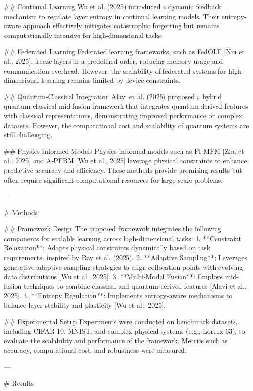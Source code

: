 ## Continual Learning  
Wu et al. (2025) introduced a dynamic feedback mechanism to regulate layer entropy in continual learning models. Their entropy-aware approach effectively mitigates catastrophic forgetting but remains computationally intensive for high-dimensional tasks.

## Federated Learning  
Federated learning frameworks, such as FedOLF [Niu et al., 2025], freeze layers in a predefined order, reducing memory usage and communication overhead. However, the scalability of federated systems for high-dimensional learning remains limited by device constraints.

## Quantum-Classical Integration  
Alavi et al. (2025) proposed a hybrid quantum-classical mid-fusion framework that integrates quantum-derived features with classical representations, demonstrating improved performance on complex datasets. However, the computational cost and scalability of quantum systems are still challenging.

## Physics-Informed Models  
Physics-informed models such as PI-MFM [Zhu et al., 2025] and A-PFRM [Wu et al., 2025] leverage physical constraints to enhance predictive accuracy and efficiency. These methods provide promising results but often require significant computational resources for large-scale problems.

---

# Methods  

## Framework Design  
The proposed framework integrates the following components for scalable learning across high-dimensional tasks:  
1. **Constraint Relaxation**: Adapts physical constraints dynamically based on task requirements, inspired by Ray et al. (2025).  
2. **Adaptive Sampling**: Leverages generative adaptive sampling strategies to align collocation points with evolving data distributions [Wu et al., 2025].  
3. **Multi-Modal Fusion**: Employs mid-fusion techniques to combine classical and quantum-derived features [Alavi et al., 2025].  
4. **Entropy Regulation**: Implements entropy-aware mechanisms to balance layer stability and plasticity [Wu et al., 2025].

## Experimental Setup  
Experiments were conducted on benchmark datasets, including CIFAR-10, MNIST, and complex physical systems (e.g., Lorenz-63), to evaluate the scalability and performance of the framework. Metrics such as accuracy, computational cost, and robustness were measured.

---

# Results  

